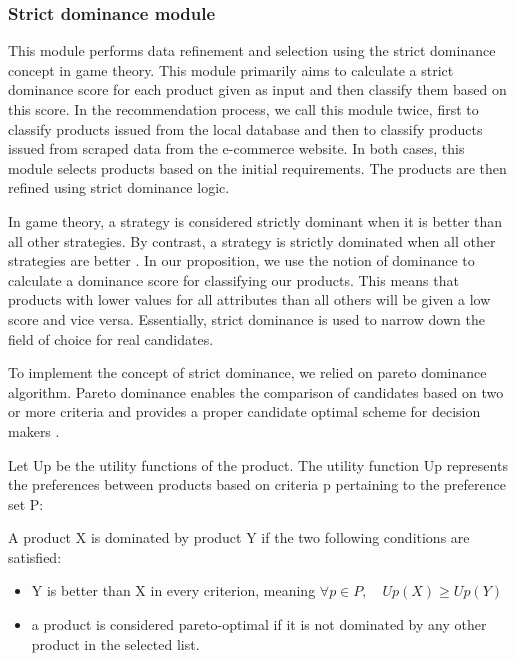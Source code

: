 \documentclass[preprint,3p,onecolumn]{elsarticle}
\begin{document}
\subsubsection{Strict dominance module}
\par This module performs data refinement and selection using the strict dominance concept in game theory. This module primarily aims to calculate a strict dominance score for each product given as input and then classify them based on this score. In the recommendation process, we call this module twice, first to classify products issued from the local database and then to classify products issued from scraped data from the e-commerce website. In both cases, this module selects products based on the initial requirements. The products are then refined using strict dominance logic. 

\par In game theory, a strategy is considered strictly dominant when it is better than all other strategies. By contrast, a strategy is strictly dominated when all other strategies are better \citep {straffin1993game}. In our proposition, we use the notion of dominance to calculate a dominance score for classifying our products. This means that products with lower values for all attributes than all others will be given a low score and vice versa. Essentially, strict dominance is used to narrow down the field of choice for real candidates.

\par To implement the concept of strict dominance, we relied on pareto dominance algorithm. Pareto dominance enables the comparison of candidates based on two or more criteria and provides a proper candidate optimal scheme for decision makers \citep {zhang2018pareto}. 

\par Let Up be the utility functions of the product. The utility function Up represents the preferences between products based on criteria p pertaining to the preference set P: 
\par A product X is dominated by product Y if the two following conditions are satisfied:
\begin{itemize}
\item Y is better than X in every criterion, meaning $\forall p \in P, \quad  Up(X) \geq Up(Y)$
\item a product is considered pareto-optimal if it is not dominated by any other product in the selected list.
\end{itemize}
\end{document}
